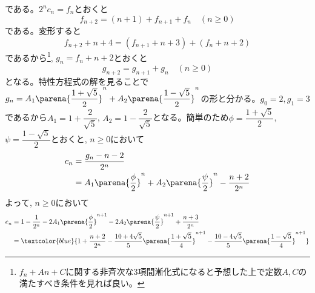 である。$2^{n}c_n = f_n$とおくと
\[f_{n+2} = (n+1) + f_{n+1} + f_n\quad (n\geq 0)\]
である。変形すると
\[f_{n+2} + n+4 = (f_{n+1} + n+3) + (f_n + n+2)\]
であるから\footnote{$f_n + An + C$に関する非斉次な3項間漸化式になると予想した上で定数$A,C$の満たすべき条件を見れば良い。}, $g_{n} = f_n + n+2$とおくと
\[g_{n+2} = g_{n+1} + g_n\quad (n\geq 0)\]
となる。特性方程式の解を見ることで$g_{n} = A_1\parena{\dfrac{1+\sqrt{5}}{2}}^{n} + A_2\parena{\dfrac{1-\sqrt{5}}{2}}^{n}$の形と分かる。$g_0 = 2, g_1 = 3$であるから$A_1 = 1+\dfrac{2}{\sqrt{5}}$, $A_2 = 1-\dfrac{2}{\sqrt{5}}$となる。簡単のため$\phi = \dfrac{1+\sqrt{5}}{2}$, $\psi=\dfrac{1-\sqrt{5}}{2}$とおくと, $n\geq 0$において
\begin{align*}
c_n &= \dfrac{g_n - n -2}{2^{n}} \\
&= A_1\parena{\dfrac{\phi}{2}}^{n} + A_2\parena{\dfrac{\psi}{2}}^{n}  - \dfrac{n+2}{2^{n}}
\end{align*}
よって, $n\geq 0$において
{\footnotesize
\begin{align*}
e_n &= 1 - \dfrac{1}{2^{n}} - 2A_1\parena{\dfrac{\phi}{2}}^{n+1} - 2A_2\parena{\dfrac{\psi}{2}}^{n+1} + \dfrac{n+3}{2^{n}}\\
&=\textcolor{blue}{ 1+ \dfrac{n+2}{2^{n}} - \dfrac{10+4\sqrt{5}}{5}\parena{\dfrac{1+\sqrt{5}}{4}}^{n+1} - \dfrac{10-4\sqrt{5}}{5}\parena{\dfrac{1-\sqrt{5}}{4}}^{n+1}}
\end{align*}
}
